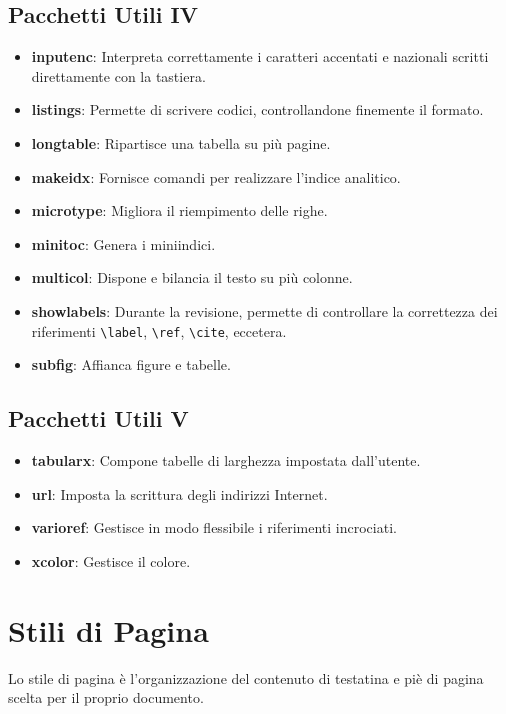 \documentclass{article}
\begin{document}
            \subsection{Pacchetti Utili IV}
                \begin{itemize}
                    \item \textbf{inputenc}: Interpreta correttamente i caratteri accentati e nazionali scritti direttamente con la tastiera.
                    \item \textbf{listings}: Permette di scrivere codici, controllandone finemente il formato.
                    \item \textbf{longtable}: Ripartisce una tabella su più pagine.
                    \item \textbf{makeidx}: Fornisce comandi per realizzare l'indice analitico.
                    \item \textbf{microtype}: Migliora il riempimento delle righe.
                    \item \textbf{minitoc}: Genera i miniindici.
                    \item \textbf{multicol}: Dispone e bilancia il testo su più colonne.
                    \item \textbf{showlabels}: Durante la revisione, permette di controllare la correttezza dei riferimenti \verb!\label!, \verb!\ref!, \verb!\cite!, eccetera.
                    \item \textbf{subfig}: Affianca figure e tabelle.
                \end{itemize}

            \subsection{Pacchetti Utili V}
                \begin{itemize}
                    \item \textbf{tabularx}: Compone tabelle di larghezza impostata dall'utente.
                    \item \textbf{url}: Imposta la scrittura degli indirizzi Internet.
                    \item \textbf{varioref}: Gestisce in modo flessibile i riferimenti incrociati.
                    \item \textbf{xcolor}: Gestisce il colore.
                \end{itemize}
            
        \section{Stili di Pagina}
            Lo stile di pagina è l'organizzazione del contenuto di testatina e piè di pagina scelta per il proprio documento. \\
\end{document}
